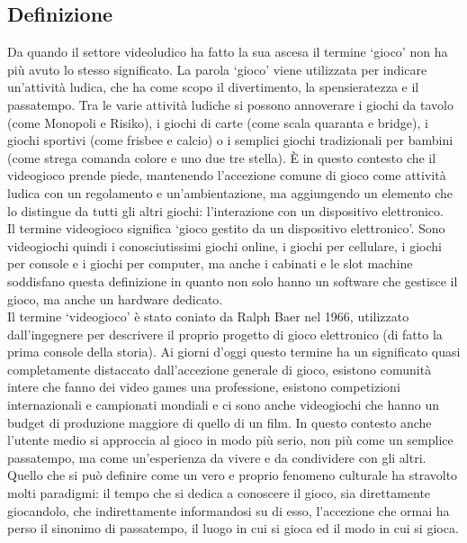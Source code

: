     \subsection{Definizione}\label{subsec:VideogiochiDef}
        Da quando il settore videoludico ha fatto la sua ascesa il termine `gioco' non ha più avuto lo stesso significato. La parola `gioco' viene utilizzata per indicare un'attività 
        ludica, che ha come scopo il divertimento, la spensieratezza e il passatempo. Tra le varie attività ludiche si possono annoverare i giochi da tavolo (come Monopoli e Risiko),
        i giochi di carte (come scala quaranta e bridge), i giochi sportivi (come frisbee e calcio) o i semplici giochi tradizionali per bambini (come strega comanda colore e uno due 
        tre stella). È in questo contesto che il videogioco prende piede, mantenendo l'accezione comune di gioco come attività ludica con un regolamento e un'ambientazione, ma 
        aggiungendo un elemento che lo distingue da tutti gli altri giochi: l'interazione con un dispositivo elettronico. \\
        Il termine videogioco significa `gioco gestito da un dispositivo elettronico'. Sono videogiochi quindi i conosciutissimi giochi online, i giochi per cellulare, i giochi per console 
        e i giochi per computer, ma anche i cabinati e le slot machine soddisfano questa definizione in quanto non solo hanno un software che gestisce il gioco, ma anche un hardware dedicato.\\
        Il termine `videogioco' è stato coniato da Ralph Baer nel 1966, utilizzato dall'ingegnere per descrivere il proprio progetto di gioco elettronico (di fatto la prima console della storia).
        Ai giorni d'oggi questo termine ha un significato quasi completamente distaccato dall'accezione generale di gioco, esistono comunità intere che fanno dei video games una professione,
        esistono competizioni internazionali e campionati mondiali e ci sono anche videogiochi che hanno un budget di produzione maggiore di quello di un film. In questo contesto anche l'utente
        medio si approccia al gioco in modo più serio, non più come un semplice passatempo, ma come un'esperienza da vivere e da condividere con gli altri. Quello che si può definire come
        un vero e proprio fenomeno culturale ha stravolto molti paradigmi: il tempo che si dedica a conoscere il gioco, sia direttamente giocandolo, che indirettamente informandosi su di esso,
        l'accezione che ormai ha perso il sinonimo di passatempo, il luogo in cui si gioca ed il modo in cui si gioca.\\ 


